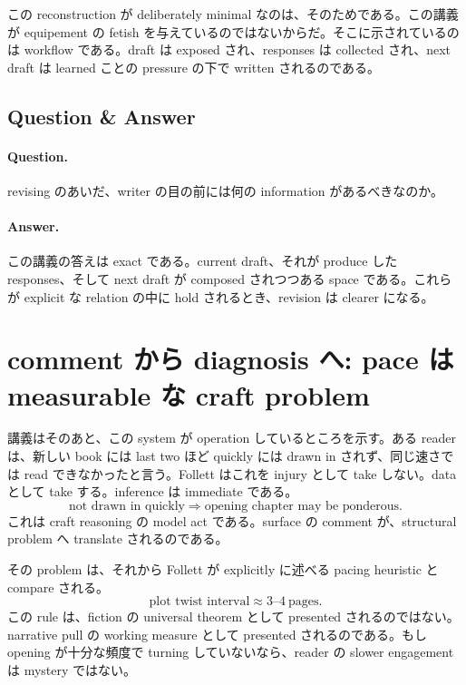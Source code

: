この reconstruction が deliberately minimal なのは、そのためである。この講義が equipement の fetish を与えているのではないからだ。そこに示されているのは workflow である。draft は exposed され、responses は collected され、next draft は learned ことの pressure の下で written されるのである。

\subsection{Question \& Answer}

\paragraph{Question.} revising のあいだ、writer の目の前には何の information があるべきなのか。

\paragraph{Answer.} この講義の答えは exact である。current draft、それが produce した responses、そして next draft が composed されつつある space である。これらが explicit な relation の中に hold されるとき、revision は clearer になる。

\section{comment から diagnosis へ: pace は measurable な craft problem}

講義はそのあと、この system が operation しているところを示す。ある reader は、新しい book には last two ほど quickly には drawn in されず、同じ速さでは read できなかったと言う。Follett はこれを injury として take しない。data として take する。inference は immediate である。
\begin{equation}
\text{not drawn in quickly} \Rightarrow \text{opening chapter may be ponderous}.
\end{equation}
これは craft reasoning の model act である。surface の comment が、structural problem へ translate されるのである。

その problem は、それから Follett が explicitly に述べる pacing heuristic と compare される。
\begin{equation}
\text{plot twist interval} \approx 3\text{--}4 \ \text{pages}.
\end{equation}
この rule は、fiction の universal theorem として presented されるのではない。narrative pull の working measure として presented されるのである。もし opening が十分な頻度で turning していないなら、reader の slower engagement は mystery ではない。

